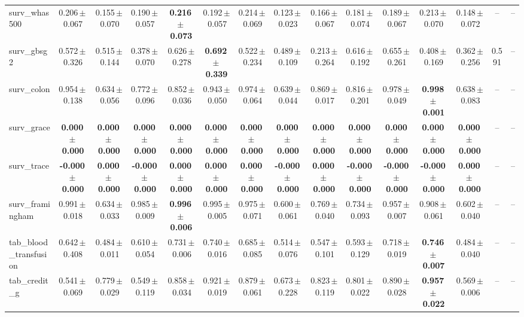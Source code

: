 \documentclass[8pt]{extarticle}
\begin{document}
\begin{longtable}{l*{14}{c}}
surv\_whas500 & 0.206\,$\pm$\,0.067 & 0.155\,$\pm$\,0.070 & 0.190\,$\pm$\,0.057 & \textbf{0.216\,$\pm$\,0.073} & 0.192\,$\pm$\,0.057 & 0.214\,$\pm$\,0.069 & 0.123\,$\pm$\,0.023 & 0.166\,$\pm$\,0.067 & 0.181\,$\pm$\,0.074 & 0.189\,$\pm$\,0.067 & 0.213\,$\pm$\,0.070 & 0.148\,$\pm$\,0.072 & -- & -- \\
surv\_gbsg2 & 0.572\,$\pm$\,0.326 & 0.515\,$\pm$\,0.144 & 0.378\,$\pm$\,0.070 & 0.626\,$\pm$\,0.278 & \textbf{0.692\,$\pm$\,0.339} & 0.522\,$\pm$\,0.234 & 0.489\,$\pm$\,0.109 & 0.213\,$\pm$\,0.264 & 0.616\,$\pm$\,0.192 & 0.655\,$\pm$\,0.261 & 0.408\,$\pm$\,0.169 & 0.362\,$\pm$\,0.256 & 0.591 & -- \\
surv\_colon & 0.954\,$\pm$\,0.138 & 0.634\,$\pm$\,0.056 & 0.772\,$\pm$\,0.096 & 0.852\,$\pm$\,0.036 & 0.943\,$\pm$\,0.050 & 0.974\,$\pm$\,0.064 & 0.639\,$\pm$\,0.044 & 0.869\,$\pm$\,0.017 & 0.816\,$\pm$\,0.201 & 0.978\,$\pm$\,0.049 & \textbf{0.998\,$\pm$\,0.001} & 0.638\,$\pm$\,0.083 & -- & -- \\
surv\_grace & \textbf{0.000\,$\pm$\,0.000} & \textbf{0.000\,$\pm$\,0.000} & \textbf{0.000\,$\pm$\,0.000} & \textbf{0.000\,$\pm$\,0.000} & \textbf{0.000\,$\pm$\,0.000} & \textbf{0.000\,$\pm$\,0.000} & \textbf{0.000\,$\pm$\,0.000} & \textbf{0.000\,$\pm$\,0.000} & \textbf{0.000\,$\pm$\,0.000} & \textbf{0.000\,$\pm$\,0.000} & \textbf{0.000\,$\pm$\,0.000} & \textbf{0.000\,$\pm$\,0.000} & -- & -- \\
surv\_trace & \textbf{-0.000\,$\pm$\,0.000} & \textbf{0.000\,$\pm$\,0.000} & \textbf{-0.000\,$\pm$\,0.000} & \textbf{0.000\,$\pm$\,0.000} & \textbf{0.000\,$\pm$\,0.000} & \textbf{0.000\,$\pm$\,0.000} & \textbf{-0.000\,$\pm$\,0.000} & \textbf{0.000\,$\pm$\,0.000} & \textbf{-0.000\,$\pm$\,0.000} & \textbf{-0.000\,$\pm$\,0.000} & \textbf{-0.000\,$\pm$\,0.000} & \textbf{0.000\,$\pm$\,0.000} & -- & -- \\
surv\_framingham & 0.991\,$\pm$\,0.018 & 0.634\,$\pm$\,0.033 & 0.985\,$\pm$\,0.009 & \textbf{0.996\,$\pm$\,0.006} & 0.995\,$\pm$\,0.005 & 0.975\,$\pm$\,0.071 & 0.600\,$\pm$\,0.061 & 0.769\,$\pm$\,0.040 & 0.734\,$\pm$\,0.093 & 0.957\,$\pm$\,0.007 & 0.908\,$\pm$\,0.061 & 0.602\,$\pm$\,0.040 & -- & -- \\
tab\_blood\_transfusion & 0.642\,$\pm$\,0.408 & 0.484\,$\pm$\,0.011 & 0.610\,$\pm$\,0.054 & 0.731\,$\pm$\,0.006 & 0.740\,$\pm$\,0.016 & 0.685\,$\pm$\,0.085 & 0.514\,$\pm$\,0.076 & 0.547\,$\pm$\,0.101 & 0.593\,$\pm$\,0.129 & 0.718\,$\pm$\,0.019 & \textbf{0.746\,$\pm$\,0.007} & 0.484\,$\pm$\,0.040 & -- & -- \\
tab\_credit\_g & 0.541\,$\pm$\,0.069 & 0.779\,$\pm$\,0.029 & 0.549\,$\pm$\,0.119 & 0.858\,$\pm$\,0.034 & 0.921\,$\pm$\,0.019 & 0.879\,$\pm$\,0.061 & 0.673\,$\pm$\,0.228 & 0.823\,$\pm$\,0.119 & 0.801\,$\pm$\,0.022 & 0.890\,$\pm$\,0.028 & \textbf{0.957\,$\pm$\,0.022} & 0.569\,$\pm$\,0.006 & -- & -- \\

\end{longtable}
\end{document}
